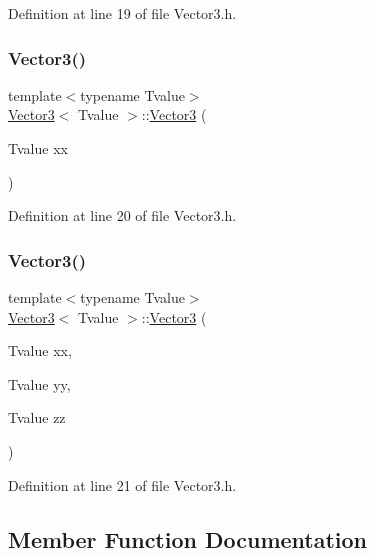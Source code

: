 Definition at line 19 of file Vector3.\+h.

\mbox{\label{class_vector3_a3edecc7c83a95dba71584e169ed0af86}} 
\subsubsection{\texorpdfstring{Vector3()}{Vector3()}\hspace{0.1cm}{\footnotesize\ttfamily [2/3]}}
{\footnotesize\ttfamily template$<$typename Tvalue$>$ \\
\hyperlink{class_vector3}{Vector3}$<$ Tvalue $>$\+::\hyperlink{class_vector3}{Vector3} (\begin{DoxyParamCaption}\item[{Tvalue}]{xx }\end{DoxyParamCaption})\hspace{0.3cm}{\ttfamily [inline]}}



Definition at line 20 of file Vector3.\+h.

\mbox{\label{class_vector3_a562c9473219f42500d74662244e5c54a}} 
\subsubsection{\texorpdfstring{Vector3()}{Vector3()}\hspace{0.1cm}{\footnotesize\ttfamily [3/3]}}
{\footnotesize\ttfamily template$<$typename Tvalue$>$ \\
\hyperlink{class_vector3}{Vector3}$<$ Tvalue $>$\+::\hyperlink{class_vector3}{Vector3} (\begin{DoxyParamCaption}\item[{Tvalue}]{xx,  }\item[{Tvalue}]{yy,  }\item[{Tvalue}]{zz }\end{DoxyParamCaption})\hspace{0.3cm}{\ttfamily [inline]}}



Definition at line 21 of file Vector3.\+h.



\subsection{Member Function Documentation}
\mbox{\label{class_vector3_a800b81a6260784ccc20ab127833c969c}} 
